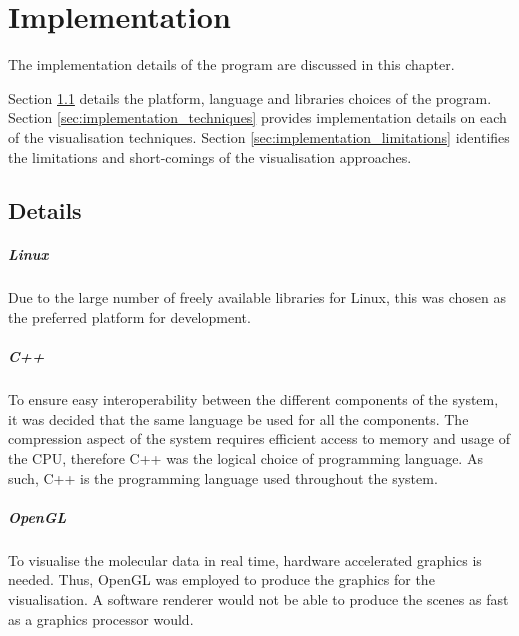\graphicspath{{./implementation/}}

\chapter{Implementation}
\label{cha:implementation}

The implementation details of the program are discussed in this chapter.

Section \ref{sec:implementation_details} details the platform, language and
libraries choices of the program. Section \ref{sec:implementation_techniques}
provides implementation details on each of the visualisation techniques.
Section \ref{sec:implementation_limitations} identifies the limitations and
short-comings of the visualisation approaches.

\section{Details}
\label{sec:implementation_details}

\paragraph{Linux}

Due to the large number of freely available libraries for Linux, this was
chosen as the preferred platform for development.


\paragraph{C++}

To ensure easy interoperability between the different components of the system,
it was decided that the same language be used for all the components. The
compression aspect of the system requires efficient access to memory and usage
of the CPU, therefore C++ was the logical choice of programming language. As
such, C++ is the programming language used throughout the system.


\paragraph{OpenGL}

To visualise the molecular data in real time, hardware accelerated graphics is
needed. Thus, OpenGL \citep{OpenGL} was employed to produce the graphics for
the visualisation. A software renderer would not be able to produce the scenes
as fast as a graphics processor would.

